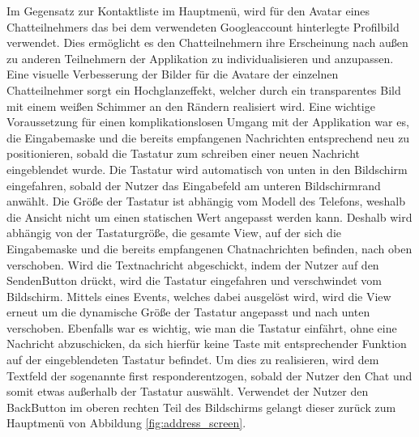 Im Gegensatz zur Kontaktliste im Hauptmenü, wird für den Avatar eines Chatteilnehmers das bei dem verwendeten Googleaccount hinterlegte Profilbild verwendet. Dies ermöglicht es den Chatteilnehmern ihre Erscheinung nach außen zu anderen Teilnehmern der Applikation zu individualisieren und anzupassen. Eine visuelle Verbesserung der Bilder für die Avatare der einzelnen Chatteilnehmer sorgt ein Hochglanzeffekt, welcher durch ein transparentes Bild mit einem weißen Schimmer an den Rändern realisiert wird.
\newline
\newline
Eine wichtige Voraussetzung für einen komplikationslosen Umgang mit der Applikation war es, die Eingabemaske und die bereits empfangenen Nachrichten entsprechend neu zu positionieren, sobald die Tastatur zum schreiben einer neuen Nachricht eingeblendet wurde. Die Tastatur wird automatisch von unten in den Bildschirm eingefahren, sobald der Nutzer das Eingabefeld am unteren Bildschirmrand anwählt. Die Größe der Tastatur ist abhängig vom Modell des Telefons, weshalb die Ansicht nicht um einen statischen Wert angepasst werden kann. Deshalb wird abhängig von der Tastaturgröße, die gesamte View, auf der sich die Eingabemaske und die bereits empfangenen Chatnachrichten befinden, nach oben verschoben.
Wird die Textnachricht abgeschickt, indem der Nutzer auf den \glqq Senden\grqq{-}Button drückt, wird die Tastatur eingefahren und verschwindet vom Bildschirm. Mittels eines Events, welches dabei ausgelöst wird, wird die View erneut um die dynamische Größe der Tastatur angepasst und nach unten verschoben.
Ebenfalls war es wichtig, wie man die Tastatur einfährt, ohne eine Nachricht abzuschicken, da sich hierfür keine Taste mit entsprechender Funktion auf der eingeblendeten Tastatur befindet. Um dies zu realisieren, wird dem Textfeld der sogenannte \glqq first responder\grqq{ }entzogen, sobald der Nutzer den Chat und somit etwas außerhalb der Tastatur auswählt.
\newline
Verwendet der Nutzer den \glqq Back\grqq{-}Button im oberen rechten Teil des Bildschirms gelangt dieser zurück zum Hauptmenü von Abbildung \ref{fig:address_screen}.
\newpage
